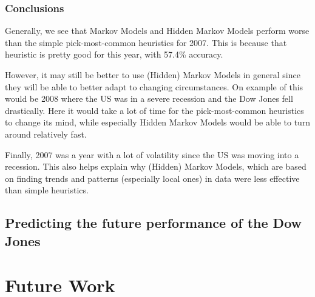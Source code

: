 \documentclass[10pt, twocolumn]{article}
\begin{document}
\subsubsection{Conclusions}

Generally, we see that Markov Models and Hidden Markov Models perform worse than the simple pick-most-common heuristics for 2007. This is because that heuristic is pretty good for this year, with 57.4\% accuracy.

However, it may still be better to use (Hidden) Markov Models in general since they will be able to better adapt to changing circumstances. On example of this would be 2008 where the US was in a severe recession and the Dow Jones fell drastically. Here it would take a lot of time for the pick-most-common heuristics to change its mind, while especially Hidden Markov Models would be able to turn around relatively fast.

Finally, 2007 was a year with a lot of volatility since the US was moving into a recession.
This also helps explain why (Hidden) Markov Models, which are based on finding trends and patterns (especially local ones) in data were less effective than simple heuristics.


\subsection{Predicting the future performance of the Dow Jones}
\label{predict-dj}

\section{Future Work}



\end{document}
